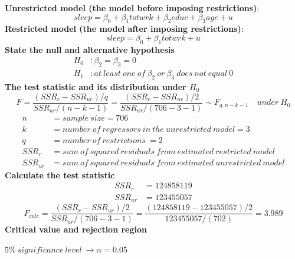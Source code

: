 \documentclass[12pt]{report}
\begin{document}
\newpage
\noindent \textbf{Unrestricted model (the model before imposing restrictions)}:
$$sleep = \beta_0 + \beta_1 totwrk + \beta_2 educ + \beta_3 age + u$$ \textbf{Restricted model (the model after imposing restrictions)}: $$sleep = \beta_0 + \beta_1 totwrk + u$$ \textbf{State the null and alternative hypothesis}
\begin{align*}
H_0&: \beta_2 = \beta_3 = 0 \\
H_1&: at\ least\ one\ of\ \beta_2\ or\ \beta_3\ does\ not\ equal\ 0
\end{align*} \textbf{The test statistic and its distribution under $H_0$}
$$F = \dfrac{(SSR_r - SSR_{ur})/q}{SSR_{ur}/(n-k-1)} = \dfrac{(SSR_r - SSR_{ur})/2}{SSR_{ur}/(706-3-1)} \sim F_{q,n-k-1} \quad under\ H_0$$
\begin{align*}
n &= sample\ size = 706 \\
k &= number\ of\ regressors\ in\ the\ unrestricted\ model = 3 \\
q &= number\ of\ restrictions\ = 2 \\
SSR_{r} &= sum\ of\ squared\ residuals\ from\ estimated\ restricted\ model \\
SSR_{ur} &= sum\ of\ squared\ residuals\ from\ estimated\ unrestricted\ model
\end{align*} \textbf{Calculate the test statistic}
\begin{align*}
	SSR_r &= 124858119 \\
	SSR_{ur} &= 123455057
\end{align*}
$$F_{calc} = \dfrac{(SSR_r - SSR_{ur})/2}{SSR_{ur}/(706-3-1)} = \dfrac{(124858119 - 123455057)/2}{123455057/(702)} = 3.989$$ \textbf{Critical value and rejection region}

\noindent $5\%\ significance\ level\ \to \alpha = 0.05$
\end{document}
